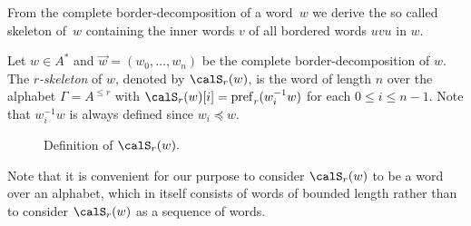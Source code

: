 %

From the complete border-decomposition of a word~$w$ we derive the so called skeleton of~$w$ containing the inner words $v$ of all bordered words $uvu$ in $w$.

\begin{definition}
	Let $w\in A^\ast$ and $\vec{w} = (w_0,\ldots,w_n)$ be the complete border-decomposition of $w$. The \emph{$r$-skeleton} of $w$, denoted by $\calS_r(w)$, is the word of length $n$ over the alphabet $\Gamma = A^{\leq r}$ with $\calS_r(w)[i] = \pref_r(w_i^{-1}w)$ for each $0\leq i\leq n-1$. Note that $w_i^{-1}w$ is always defined since $w_i\preceq w$.
	\begin{figure}[H]
	\begin{center}
		
	\end{center}\label{fig:skeletondef}\caption{Definition of $\calS_r(w).$}
    \end{figure}
\end{definition}
Note that it is convenient for our purpose to consider $\calS_r(w)$ to be a word over an alphabet, which in itself consists of words of bounded length rather than to consider $\calS_r(w)$ as a sequence of words.

